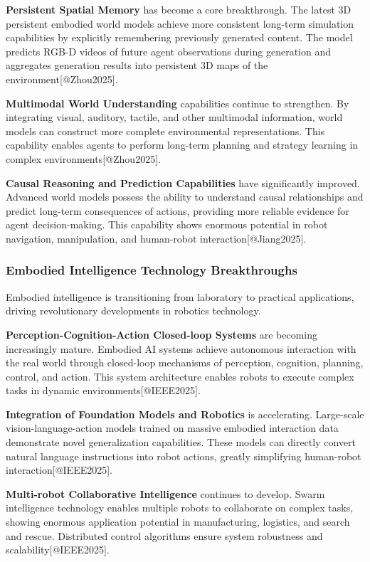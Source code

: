 \documentclass{article}
\begin{document}
\textbf{Persistent Spatial Memory} has become a core breakthrough. The latest 3D persistent embodied world models achieve more consistent long-term simulation capabilities by explicitly remembering previously generated content. The model predicts RGB-D videos of future agent observations during generation and aggregates generation results into persistent 3D maps of the environment[@Zhou2025].

\textbf{Multimodal World Understanding} capabilities continue to strengthen. By integrating visual, auditory, tactile, and other multimodal information, world models can construct more complete environmental representations. This capability enables agents to perform long-term planning and strategy learning in complex environments[@Zhou2025].

\textbf{Causal Reasoning and Prediction Capabilities} have significantly improved. Advanced world models possess the ability to understand causal relationships and predict long-term consequences of actions, providing more reliable evidence for agent decision-making. This capability shows enormous potential in robot navigation, manipulation, and human-robot interaction[@Jiang2025].

\subsubsection{Embodied Intelligence Technology Breakthroughs}
Embodied intelligence is transitioning from laboratory to practical applications, driving revolutionary developments in robotics technology.

\textbf{Perception-Cognition-Action Closed-loop Systems} are becoming increasingly mature. Embodied AI systems achieve autonomous interaction with the real world through closed-loop mechanisms of perception, cognition, planning, control, and action. This system architecture enables robots to execute complex tasks in dynamic environments[@IEEE2025].

\textbf{Integration of Foundation Models and Robotics} is accelerating. Large-scale vision-language-action models trained on massive embodied interaction data demonstrate novel generalization capabilities. These models can directly convert natural language instructions into robot actions, greatly simplifying human-robot interaction[@IEEE2025].

\textbf{Multi-robot Collaborative Intelligence} continues to develop. Swarm intelligence technology enables multiple robots to collaborate on complex tasks, showing enormous application potential in manufacturing, logistics, and search and rescue. Distributed control algorithms ensure system robustness and scalability[@IEEE2025].
\end{document}

